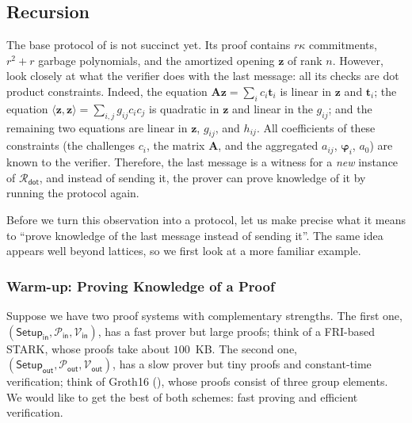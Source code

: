 \documentclass[../../book.tex]{subfiles}
\begin{document}
\subsection{Recursion}\label{section:labrador-recursion}

The base protocol of  is not succinct yet.
Its proof contains $r\kappa$ commitments, $r^2 + r$ garbage polynomials, and the amortized opening $\mathbf{z}$ of rank $n$.
However, look closely at what the verifier does with the last message: all its checks are dot product constraints.
Indeed, the equation $\mathbf{A}\mathbf{z} = \sum_i c_i\mathbf{t}_i$ is linear in $\mathbf{z}$ and $\mathbf{t}_i$; the equation $\langle \mathbf{z}, \mathbf{z} \rangle = \sum_{i,j} g_{ij}c_ic_j$ is quadratic in $\mathbf{z}$ and linear in the $g_{ij}$; and the remaining two equations are linear in $\mathbf{z}$, $g_{ij}$, and $h_{ij}$.
All coefficients of these constraints (the challenges $c_i$, the matrix $\mathbf{A}$, and the aggregated $a_{ij}$, $\boldsymbol{\varphi}_i$, $a_0$) are known to the verifier.
Therefore, the last message is a witness for a \emph{new} instance of $\mathcal{R}_{\mathsf{dot}}$, and instead of sending it, the prover can prove knowledge of it by running the protocol again.

Before we turn this observation into a protocol, let us make precise what it means to ``prove knowledge of the last message instead of sending it''.
The same idea appears well beyond lattices, so we first look at a more familiar example.

\subsubsection{Warm-up: Proving Knowledge of a Proof}

Suppose we have two proof systems with complementary strengths.
The first one, $(\mathsf{Setup}_{\mathsf{in}}, \mathcal{P}_{\mathsf{in}}, \mathcal{V}_{\mathsf{in}})$, has a fast prover but large proofs; think of a FRI-based STARK, whose proofs take about $100$~KB.
The second one, $(\mathsf{Setup}_{\mathsf{out}}, \mathcal{P}_{\mathsf{out}}, \mathcal{V}_{\mathsf{out}})$, has a slow prover but tiny proofs and constant-time verification; think of Groth16 (), whose proofs consist of three group elements.
We would like to get the best of both schemes: fast proving and efficient verification.
\end{document}
